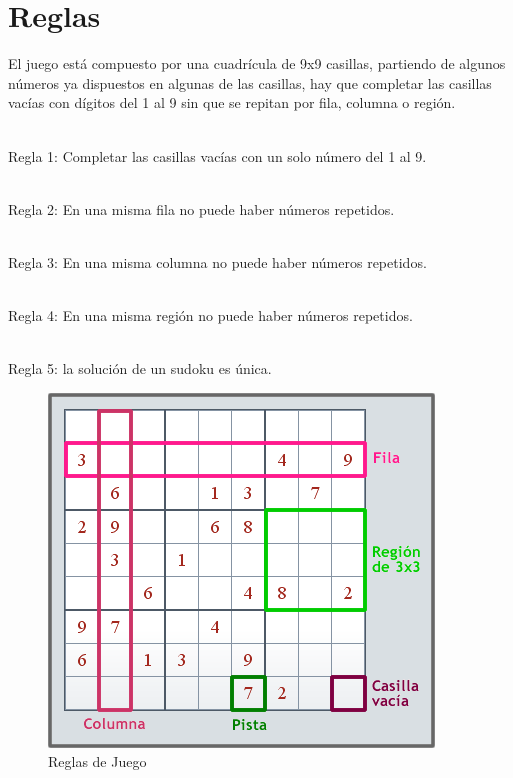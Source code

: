 \section{Reglas}

El juego está compuesto por una cuadrícula de 9x9 casillas, partiendo de algunos números ya dispuestos en algunas de las casillas, hay que completar las casillas vacías con dígitos del 1 al 9 sin que se repitan por fila, columna o región. 

\ \\

Regla 1: Completar las casillas vacías con un solo número del 1 al 9. 

\ \\ 

Regla 2: En una misma fila no puede haber números repetidos. 

\ \\ 

Regla 3: En una misma columna no puede haber números repetidos.

\ \\ 

Regla 4: En una misma región no puede haber números repetidos. 

\ \\ 

Regla 5: la solución de un sudoku es única.

\begin{figure}[htbp]
\begin{center}
\includegraphics[width=.50\textwidth]{./imagenes/Reglas.png}
\caption{Reglas de Juego}
\label{Reglas}
\end{center}
\end{figure}

